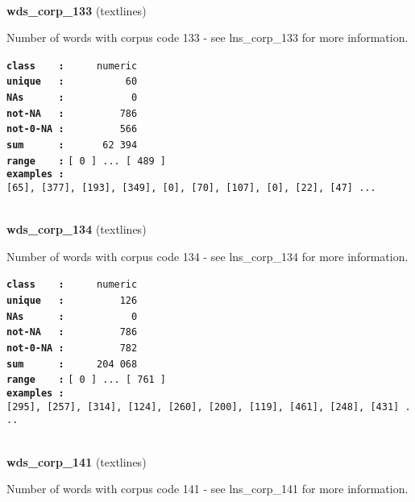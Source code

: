 \documentclass[]{article}
\begin{document}
~

\textbf{wds\_corp\_133} (textlines)

Number of words with corpus code 133 - see lns\_corp\_133 for more
information.

\textbf{\texttt{class\ \ \ \ :}} \texttt{~~~~~numeric}\\
\textbf{\texttt{unique\ \ \ :}} \texttt{~~~~~~~~~~60}\\
\textbf{\texttt{NAs\ \ \ \ \ \ :}} \texttt{~~~~~~~~~~~0}\\
\textbf{\texttt{not-NA\ \ \ :}} \texttt{~~~~~~~~~786}\\
\textbf{\texttt{not-0-NA\ :}} \texttt{~~~~~~~~~566}\\
\textbf{\texttt{sum\ \ \ \ \ \ :}} \texttt{~~~~~~62~394}\\
\textbf{\texttt{range\ \ \ \ :}}
\texttt{{[}\ 0\ {]}\ ...\ {[}\ 489\ {]}}\\
\textbf{\texttt{examples\ :}}
\texttt{{[}65{]},\ {[}377{]},\ {[}193{]},\ {[}349{]},\ {[}0{]},\ {[}70{]},\ {[}107{]},\ {[}0{]},\ {[}22{]},\ {[}47{]}\ ...}\\

~

\textbf{wds\_corp\_134} (textlines)

Number of words with corpus code 134 - see lns\_corp\_134 for more
information.

\textbf{\texttt{class\ \ \ \ :}} \texttt{~~~~~numeric}\\
\textbf{\texttt{unique\ \ \ :}} \texttt{~~~~~~~~~126}\\
\textbf{\texttt{NAs\ \ \ \ \ \ :}} \texttt{~~~~~~~~~~~0}\\
\textbf{\texttt{not-NA\ \ \ :}} \texttt{~~~~~~~~~786}\\
\textbf{\texttt{not-0-NA\ :}} \texttt{~~~~~~~~~782}\\
\textbf{\texttt{sum\ \ \ \ \ \ :}} \texttt{~~~~~204~068}\\
\textbf{\texttt{range\ \ \ \ :}}
\texttt{{[}\ 0\ {]}\ ...\ {[}\ 761\ {]}}\\
\textbf{\texttt{examples\ :}}
\texttt{{[}295{]},\ {[}257{]},\ {[}314{]},\ {[}124{]},\ {[}260{]},\ {[}200{]},\ {[}119{]},\ {[}461{]},\ {[}248{]},\ {[}431{]}\ ...}\\

~

\textbf{wds\_corp\_141} (textlines)

Number of words with corpus code 141 - see lns\_corp\_141 for more
information.
\end{document}
